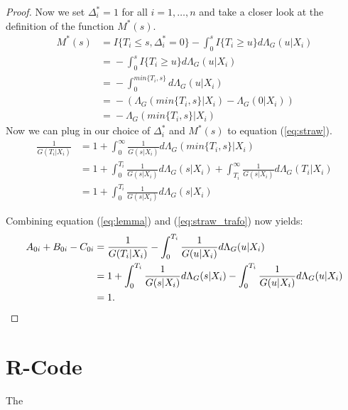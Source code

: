 \documentclass[12pt, a4paper]{scrartcl}
\theoremstyle{definition}
\theoremstyle{plain}
\numberwithin{equation}{section}
\numberwithin{figure}{section}
\numberwithin{table}{section}
\begin{document}
\begin{appendices}
\begin{proof}
			Now we set $ \Delta^*_i=1$ for all $i=1,\dots,n$ and take a closer look at the definition of the function $M^*(s)$.
			\begin{equation*}
			\begin{split}
			M^*(s) &={} I\{T_i \leq s, \Delta^*_i = 0\} - \int_{0}^s I\{T_i\geq u\}d\Lambda_G(u\vert X_i)\\
			& ={} - \int_{0}^s I\{T_i\geq u\}d\Lambda_G(u\vert X_i)\\
			& ={} - \int_0^{min\{T_i,s\}}d\Lambda_G(u\vert X_i)\\
			& ={} - \left(\Lambda_G(min\{T_i,s\}\vert X_i)-\Lambda_G(0\vert X_i)\right)\\
			& ={} - \Lambda_G(min\{T_i,s\}\vert X_i)
			\end{split}
			\end{equation*}
			Now we can plug in our choice of $\Delta^*_i$ and $M^*(s)$ to equation (\ref{eq:straw}).
			\begin{equation}\label{eq:straw_trafo}
			\begin{split}
			\frac{1}{G(T_i\vert X_i)} &={} 1 + \int_{0}^{\infty} \frac{1}{G(s\vert X_i)} d\Lambda_G(min\{T_i,s\}\vert X_i)\\
			&={} 1 + \int_{0}^{T_i} \frac{1}{G(s\vert X_i)} d\Lambda_G(s\vert X_i) + \int_{T_i}^{\infty} \frac{1}{G(s\vert X_i)} d\Lambda_G(T_i\vert X_i)\\
			& ={} 1 + \int_{0}^{T_i} \frac{1}{G(s\vert X_i)} d\Lambda_G(s\vert X_i)
			\end{split}
			\end{equation}
		
			Combining equation (\ref{eq:lemma}) and (\ref{eq:straw_trafo}) now yields:
			\begin{equation*}
			\begin{split}
			A_{0i}+B_{0i}-C_{0i}&={}\frac{1}{G(T_i \vert X_i)} - \int_{0}^{T_i}\frac{1}{G(u\vert X_i)}d\Lambda_G(u\vert X_i)\\
			&={} 1 + \int_{0}^{T_i} \frac{1}{G(s\vert X_i)} d\Lambda_G(s\vert X_i)  - \int_{0}^{T_i}\frac{1}{G(u\vert X_i)}d\Lambda_G(u\vert X_i)\\
			&={} 1. \qedhere
			\end{split}
			\end{equation*}
		\end{proof}
		
		\section{R-Code}
		The 
		
	\end{appendices}
	
\end{document}
